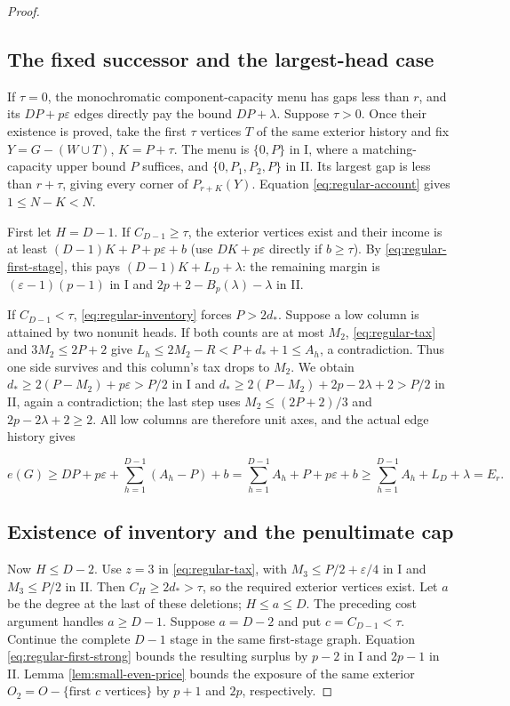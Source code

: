 \documentclass[11pt,a4paper]{article}
\theoremstyle{definition}
\begin{document}
\begin{proof}
\subsection*{The fixed successor and the largest-head case}
If $\tau=0$, the monochromatic component-capacity menu has gaps less than $r$,
and its $DP+p\varepsilon$ edges directly pay the bound $DP+\lambda$.
Suppose $\tau>0$. Once their existence is proved, take the first $\tau$
vertices $T$ of the same exterior history and fix
$Y=G-(W\cup T)$, $K=P+\tau$.
The menu is $\{0,P\}$ in I, where a matching-capacity upper bound $P$ suffices,
and $\{0,P_1,P_2,P\}$ in II. Its largest gap is less than $r+\tau$,
giving every corner of $P_{r+K}(Y)$.
Equation \eqref{eq:regular-account} gives $1\le N-K<N$.

First let $H=D-1$. If $C_{D-1}\ge\tau$, the exterior vertices exist
and their income is at least $(D-1)K+P+p\varepsilon+b$
(use $DK+p\varepsilon$ directly if $b\ge\tau$).
By \eqref{eq:regular-first-stage}, this pays
$(D-1)K+L_D+\lambda$: the remaining margin is
$(\varepsilon-1)(p-1)$ in I and $2p+2-B_p(\lambda)-\lambda$ in II.

If $C_{D-1}<\tau$, \eqref{eq:regular-inventory} forces $P>2d_*$.
Suppose a low column is attained by two nonunit heads.
If both counts are at most $M_2$, \eqref{eq:regular-tax} and
$3M_2\le2P+2$ give $L_h\le2M_2-R<P+d_*+1\le A_h$, a contradiction.
Thus one side survives and this column's tax drops to $M_2$.
We obtain $d_*\ge2(P-M_2)+p\varepsilon>P/2$ in I and
$d_*\ge2(P-M_2)+2p-2\lambda+2>P/2$ in II, again a contradiction;
the last step uses $M_2\le(2P+2)/3$ and $2p-2\lambda+2\ge2$.
All low columns are therefore unit axes, and the actual edge history gives

\[
e(G)\ge DP+p\varepsilon+\sum_{h=1}^{D-1}(A_h-P)+b
=\sum_{h=1}^{D-1}A_h+P+p\varepsilon+b
\ge\sum_{h=1}^{D-1}A_h+L_D+\lambda=E_r.
\]
\subsection*{Existence of inventory and the penultimate cap}
Now $H\le D-2$. Use $z=3$ in \eqref{eq:regular-tax},
with $M_3\le P/2+\varepsilon/4$ in I and $M_3\le P/2$ in II.
Then $C_H\ge2d_*>\tau$, so the required exterior vertices exist.
Let $a$ be the degree at the last of these deletions; $H\le a\le D$.
The preceding cost argument handles $a\ge D-1$.
Suppose $a=D-2$ and put $c=C_{D-1}<\tau$.
Continue the complete $D-1$ stage in the same first-stage graph.
Equation \eqref{eq:regular-first-strong} bounds the resulting surplus
by $p-2$ in I and $2p-1$ in II.
Lemma \ref{lem:small-even-price} bounds the exposure of the same exterior
$O_2=O-\{\text{first }c\text{ vertices}\}$ by $p+1$ and $2p$, respectively.


\end{proof}
\end{document}
